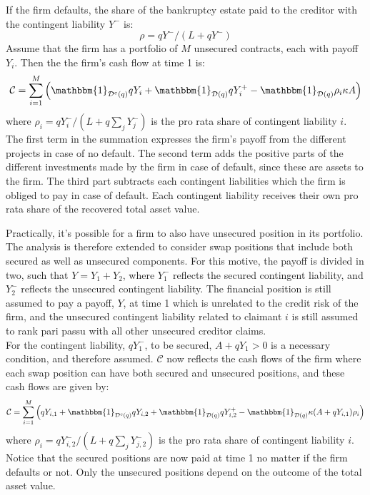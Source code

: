 \documentclass[../main.tex]{subfiles}
\begin{document}
        If the firm defaults, the share of the bankruptcy estate paid to the creditor with 
        the contingent liability $Y^{-}$ is:
            \begin{equation*}
                \rho = qY^{-}/(L + qY^{-})
            \end{equation*}
        Assume that the firm has a portfolio of $M$ unsecured contracts, each with payoff $Y_{i}$.
        Then the the firm's cash flow at time 1 is:
        \begin{equation}
            \mathcal{C} = 
            \sum_{i=1}^{M} \left(
                \mathbbm{1}_{\mathcal{D}^{c}(q)} qY_{i}
                + \mathbbm{1}_{\mathcal{D}(q)} qY_{i}^{+}
                - \mathbbm{1}_{\mathcal{D}(q)} \rho_{i} \kappa A
            \right)
        \end{equation}
        where $\rho_{i} = qY_{i}^{-}/(L + q\sum_{j} Y_{j}^{-})$ is the pro rata share of contingent liability $i$. The first term in the summation expresses the firm's payoff from the different projects in case of no default. The second term adds the positive parts of the different investments made by the firm in case of default, since these are assets to the firm. The third part subtracts each contingent liabilities which the firm is obliged to pay in case of default. Each contingent liability receives their own pro rata share of the recovered total asset value.

        Practically, it's possible for a firm to also have unsecured position in its portfolio.
        The analysis is therefore extended to consider swap positions that include both secured as well as unsecured components.
        For this motive, the payoff is divided in two, such that $Y=Y_1 + Y_2$, where $Y_1^{-}$ reflects the secured contingent liability, and $Y_2^{-}$ reflects the unsecured contingent liability.
        The financial position is still assumed to pay a payoff, $Y$, at time 1 which is unrelated to the credit risk of the firm, and the unsecured contingent liability related to claimant $i$ is still assumed to rank pari passu with all other unsecured creditor claims.\\
        For the contingent liability, $qY_1^{-}$, to be secured, $A+qY_1 > 0$ is a necessary condition, and therefore assumed.
        $\mathcal{C}$ now reflects the cash flows of the firm where each swap position can have both secured and unsecured positions, and these cash flows are given by:
        \begin{equation}
            \mathcal{C} =
            \sum_{i=1}^{M} \left(
                q Y_{i,1}
                + \mathbbm{1}_{\mathcal{D}^{c}(q)} qY_{i,2}
                + \mathbbm{1}_{\mathcal{D}(q)} qY_{i,2}^{+}
                - \mathbbm{1}_{\mathcal{D}(q)} \kappa (A + qY_{i,1}) \rho_{i}
            \right)
        \end{equation}
        where $\rho_{i} = qY_{i,2}^{-}/(L + q\sum_{j} Y_{j,2}^{-})$ is the pro rata share of contingent liability $i$. Notice that the secured positions are now paid at time 1 no matter if the firm defaults or not. Only the unsecured positions depend on the outcome of the total asset value.
\end{document}
